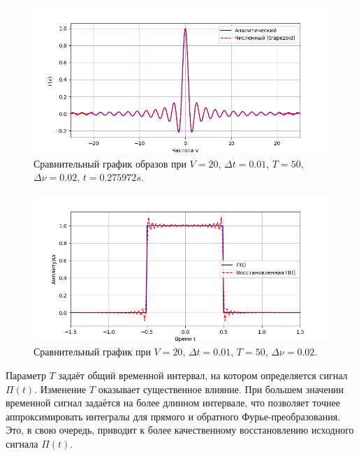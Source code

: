 \documentclass[a4paper]{article}
\begin{document}
\begin{figure}[H]
  \centering
  \includegraphics[width=\textwidth]{src/task_1_1/freq_50_0.01_20_0.02.png}
  \caption{Сравнительный график образов при $V=20$, $\Delta t=0.01$, $T=50$, $\Delta \nu=0.02$, $t=0.275972 s$.} 
\end{figure}
\begin{figure}[H]
  \centering
  \includegraphics[width=\textwidth]{src/task_1_1/time_50_0.01_20_0.02.png}
  \caption{Сравнительный график при $V=20$, $\Delta t=0.01$, $T=50$, $\Delta \nu=0.02$.} 
\end{figure}

\noindent Параметр $T$ задаёт общий временной интервал, на котором определяется сигнал $\Pi(t)$. Изменение $T$ оказывает существенное влияние. При большем значении временной сигнал задаётся на более длинном интервале, что позволяет точнее аппроксимировать интегралы для прямого и обратного Фурье-преобразования. Это, в свою очередь, приводит к более качественному восстановлению исходного сигнала $\Pi(t)$.
\end{document}
